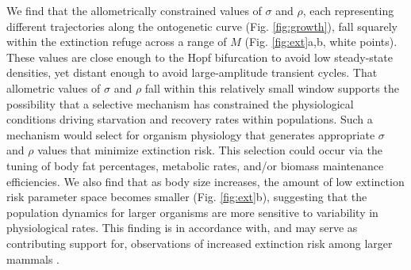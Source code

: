 \documentclass[twocolumn,preprintnumbers,amsmath,amssymb,superscriptaddress]{revtex4}
\begin{document}
We find that the allometrically constrained values of $\sigma$ and $\rho$, each representing different trajectories along the ontogenetic curve (Fig. \ref{fig:growth}), fall squarely within the extinction refuge across a range of $M$ (Fig. \ref{fig:ext}a,b, white points). These values are close enough to the Hopf bifurcation to avoid low steady-state densities, yet distant enough to avoid large-amplitude transient cycles.
That allometric values of $\sigma$ and $\rho$ fall within this relatively small window supports the possibility that a selective mechanism has constrained the physiological conditions driving starvation and recovery rates within populations.
Such a mechanism would select for organism physiology that generates appropriate $\sigma$ and $\rho$ values that minimize extinction risk.
This selection could occur via the tuning of body fat percentages, metabolic rates, and/or biomass maintenance efficiencies.
We also find that as body size increases, the amount of low extinction risk parameter space becomes smaller (Fig. \ref{fig:ext}b), suggesting that the population dynamics for larger organisms are more sensitive to variability in physiological rates.
This finding is in accordance with, and may serve as contributing support for, observations of increased extinction risk among larger mammals \cite{Liow:2008jx}.\\





\end{document}
